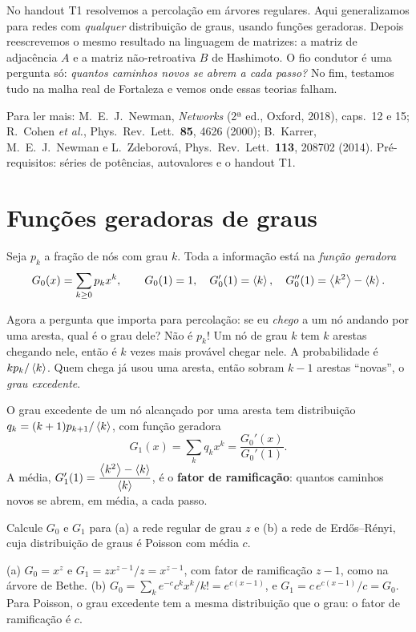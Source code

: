 \documentclass[11pt]{article}
\begin{document}
\fazertitulo

No handout T1 resolvemos a percolação em árvores regulares. Aqui generalizamos para redes com \emph{qualquer} distribuição de graus, usando funções geradoras. Depois reescrevemos o mesmo resultado na linguagem de matrizes: a matriz de adjacência $A$ e a matriz não-retroativa $B$ de Hashimoto. O fio condutor é uma pergunta só: \emph{quantos caminhos novos se abrem a cada passo?} No fim, testamos tudo na malha real de Fortaleza e vemos onde essas teorias falham.

Para ler mais: M.~E.~J.~Newman, \emph{Networks} (2ª ed., Oxford, 2018), caps.\ 12 e 15; R.~Cohen \emph{et al.}, Phys.\ Rev.\ Lett.\ \textbf{85}, 4626 (2000); B.~Karrer, M.~E.~J.~Newman e L.~Zdeborová, Phys.\ Rev.\ Lett.\ \textbf{113}, 208702 (2014). Pré-requisitos: séries de potências, autovalores e o handout T1. 

\section{Funções geradoras de graus}

Seja $p_k$ a fração de nós com grau $k$. Toda a informação está na \emph{função geradora}
\[
G_0(x) = \sum_{k\ge0} p_k x^k, \qquad G_0(1) = 1,\quad G_0'(1) = \left\langle k \right\rangle,\quad G_0''(1) = \left\langle k^2 \right\rangle-\left\langle k \right\rangle.
\]

Agora a pergunta que importa para percolação: se eu \emph{chego} a um nó andando por uma aresta, qual é o grau dele? Não é $p_k$! Um nó de grau $k$ tem $k$ arestas chegando nele, então é $k$ vezes mais provável chegar nele. A probabilidade é $k p_k/\left\langle k \right\rangle$. Quem chega já usou uma aresta, então sobram $k-1$ arestas ``novas'', o \emph{grau excedente}.

\begin{ideia}
O grau excedente de um nó alcançado por uma aresta tem distribuição $q_k = (k+1)p_{k+1}/\left\langle k \right\rangle$, com função geradora
\[
G_1(x) = \sum_k q_k x^k = \frac{G_0'(x)}{G_0'(1)}.
\]
A média, $G_1'(1) = \dfrac{\left\langle k^2 \right\rangle-\left\langle k \right\rangle}{\left\langle k \right\rangle}$, é o \textbf{fator de ramificação}: quantos caminhos novos se abrem, em média, a cada passo.
\end{ideia}

\begin{exemplo}
Calcule $G_0$ e $G_1$ para (a) a rede regular de grau $z$ e (b) a rede de Erdős--Rényi, cuja distribuição de graus é Poisson com média $c$.
\end{exemplo}
\begin{solucao}
(a) $G_0 = x^z$ e $G_1 = z x^{z-1}/z = x^{z-1}$, com fator de ramificação $z-1$, como na árvore de Bethe. (b) $G_0 = \sum_k e^{-c}c^kx^k/k! = e^{c(x-1)}$, e $G_1 = c\,e^{c(x-1)}/c = G_0$. Para Poisson, o grau excedente tem a mesma distribuição que o grau: o fator de ramificação é $c$.
\end{solucao}
\end{document}
